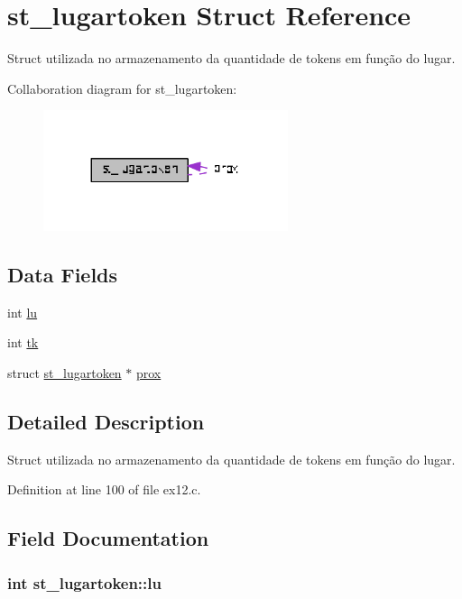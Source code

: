 \hypertarget{structst__lugartoken}{\section{st\+\_\+lugartoken Struct Reference}
\label{structst__lugartoken}
}


Struct utilizada no armazenamento da quantidade de tokens em função do lugar.  




Collaboration diagram for st\+\_\+lugartoken\+:\nopagebreak
\begin{figure}[H]
\begin{center}
\leavevmode
\includegraphics[width=203pt]{structst__lugartoken__coll__graph}
\end{center}
\end{figure}
\subsection*{Data Fields}
\begin{DoxyCompactItemize}
\item 
int \hyperlink{structst__lugartoken_aa0ef964380839df33cf936fdc0bfdf66}{lu}
\item 
int \hyperlink{structst__lugartoken_a58b3c1ed10063127a3f50aefa336250c}{tk}
\item 
struct \hyperlink{structst__lugartoken}{st\+\_\+lugartoken} $\ast$ \hyperlink{structst__lugartoken_a274f4c1422ff1d2c56e58495734b4bc3}{prox}
\end{DoxyCompactItemize}


\subsection{Detailed Description}
Struct utilizada no armazenamento da quantidade de tokens em função do lugar. 



Definition at line 100 of file ex12.\+c.



\subsection{Field Documentation}
\hypertarget{structst__lugartoken_aa0ef964380839df33cf936fdc0bfdf66}{
\subsubsection[{lu}]{\setlength{\rightskip}{0pt plus 5cm}int st\+\_\+lugartoken\+::lu}}\label{structst__lugartoken_aa0ef964380839df33cf936fdc0bfdf66}


